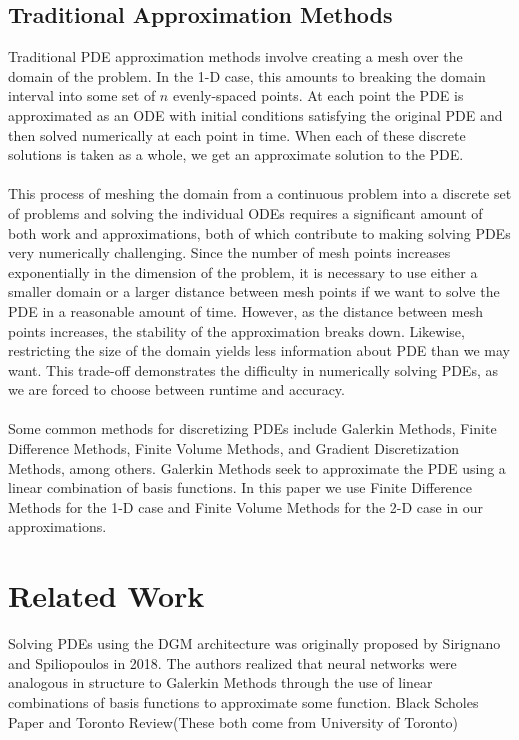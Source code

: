 \documentclass{article}
\begin{document}
\subsection{Traditional Approximation Methods}

Traditional PDE approximation methods involve creating a mesh over the domain of the problem. In the 1-D case, this amounts to breaking the domain interval into some set of $n$ evenly-spaced points. At each point the PDE is approximated as an ODE with initial conditions satisfying the original PDE and then solved numerically at each point in time. When each of these discrete solutions is taken as a whole, we get an approximate solution to the PDE. \\ \\
This process of meshing the domain from a continuous problem into a discrete set of problems and solving the individual ODEs requires a significant amount of both work and approximations, both of which contribute to making solving PDEs very numerically challenging. Since the number of mesh points increases exponentially in the dimension of the problem, it is necessary to use either a smaller domain or a larger distance between mesh points if we want to solve the PDE in a reasonable amount of time. However, as the distance between mesh points increases, the stability of the approximation breaks down. Likewise, restricting the size of the domain yields less information about PDE than we may want. This trade-off demonstrates the difficulty in numerically solving PDEs, as we are forced to choose between runtime and accuracy.\\ \\
Some common methods for discretizing PDEs include Galerkin Methods, Finite Difference Methods, Finite Volume Methods, and Gradient Discretization Methods, among others. Galerkin Methods seek to approximate the PDE using a linear combination of basis functions. In this paper we use Finite Difference Methods for the 1-D case and Finite Volume Methods for the 2-D case in our approximations.\\

\section{Related Work}

Solving PDEs using the DGM architecture was originally proposed by Sirignano and Spiliopoulos in 2018. The authors realized that neural networks were analogous in structure to Galerkin Methods through the use of linear combinations of basis functions to approximate some function. 
Black Scholes Paper and Toronto Review(These both come from University of Toronto)
\end{document}
